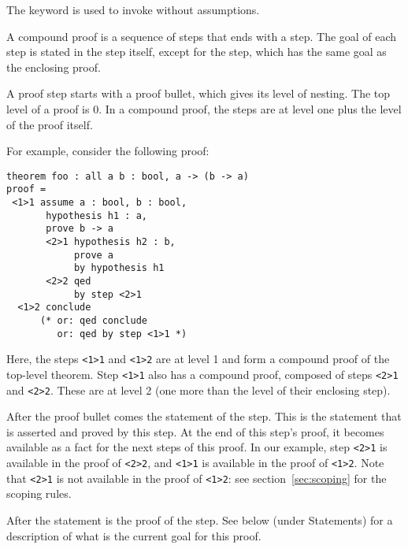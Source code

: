 The  keyword is used to invoke {\zenon} without
assumptions.

A compound proof is a sequence of steps that ends with a 
step.  The goal of each step is stated in the step itself, except for
the  step, which has the same goal as the enclosing
proof.

\begin{syn}
 \is
       
\end{syn}


A proof step starts with a proof bullet, which gives its level of
nesting.  The top level of a proof is 0.  In a compound proof, the
steps are at level one plus the level of the proof itself.

\goodbreak
For example, consider the following proof:

{\scriptsize
\begin{lstlisting}
theorem foo : all a b : bool, a -> (b -> a)
proof =
 <1>1 assume a : bool, b : bool,
       hypothesis h1 : a,
       prove b -> a
       <2>1 hypothesis h2 : b,
            prove a
            by hypothesis h1
       <2>2 qed
            by step <2>1
  <1>2 conclude
      (* or: qed conclude
         or: qed by step <1>1 *)
\end{lstlisting}}

Here, the steps \verb"<1>1" and \verb"<1>2" are at level 1
and form a compound proof of the top-level theorem.  Step \verb"<1>1"
also has a compound proof, composed of steps \verb"<2>1"
and \verb"<2>2".  These are at level 2 (one more than the level of
their enclosing step).

After the proof bullet comes the statement of the step.  This is the
statement that is asserted and proved by this step.  At the end of
this step's proof, it becomes available as a fact for the next steps
of this proof.  In our example, step \verb"<2>1" is available in the
proof of \verb"<2>2", and \verb"<1>1" is available in the proof of
\verb"<1>2".  Note that \verb"<2>1" is not available in the proof of
\verb"<1>2": see section~\ref{sec:scoping} for the scoping rules.

After the statement is the proof of the step.  See below (under
Statements) for a description of what is the current goal for this
proof.

